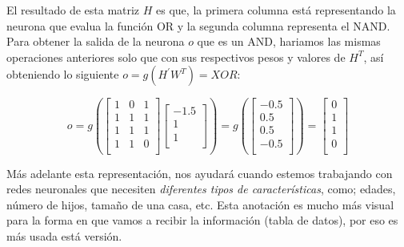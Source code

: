  El resultado de esta matriz $H$ es que, la primera columna está representando la neurona que evalua la función OR y la segunda columna representa el NAND. Para obtener la salida de la neurona $o$ que es un AND, hariamos las mismas operaciones anteriores solo que con sus respectivos pesos y valores de $H^{T}$, así obteniendo lo siguiente $o = g(H^{'}W^{T}) = XOR$:
 
 $$
 o =
 g \left(
 \begin{bmatrix}
  1 & 0 & 1 \\
  1 & 1 & 1 \\
  1 & 1 & 1 \\ 
  1 & 1 & 0\\
  \end{bmatrix}
 \begin{bmatrix}
  -1.5 \\
  1 \\
  1 \\
 \end{bmatrix}
  \right) = g \left(
 \begin{bmatrix}
  -0.5 \\
  0.5 \\
  0.5 \\
  -0.5 \\
 \end{bmatrix}
\right) =
 \begin{bmatrix}
  0 \\
  1 \\
  1 \\
  0 \\
 \end{bmatrix}
 $$


Más adelante esta representación, nos ayudará cuando estemos trabajando con redes neuronales que necesiten \emph{diferentes tipos de características}, como; edades, número de hijos, tamaño de una casa, etc. 
 Esta anotación es mucho más visual para la forma en que vamos a recibir la información (tabla de datos), por eso es más usada está versión.

